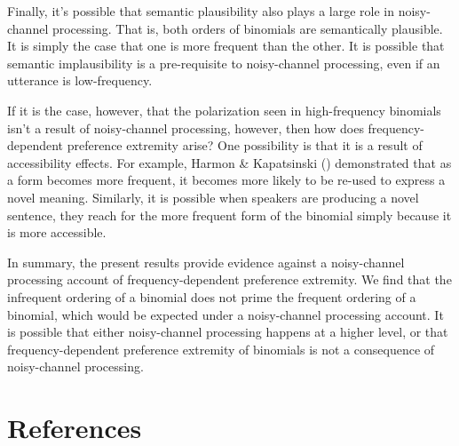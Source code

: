 \documentclass[
  12pt,
]{scrartcl}
\begin{document}
Finally, it's possible that semantic plausibility also plays a large
role in noisy-channel processing. That is, both orders of binomials are
semantically plausible. It is simply the case that one is more frequent
than the other. It is possible that semantic implausibility is a
pre-requisite to noisy-channel processing, even if an utterance is
low-frequency.

If it is the case, however, that the polarization seen in high-frequency
binomials isn't a result of noisy-channel processing, however, then how
does frequency-dependent preference extremity arise? One possibility is
that it is a result of accessibility effects. For example, Harmon \&
Kapatsinski ()
demonstrated that as a form becomes more frequent, it becomes more
likely to be re-used to express a novel meaning. Similarly, it is
possible when speakers are producing a novel sentence, they reach for
the more frequent form of the binomial simply because it is more
accessible.

In summary, the present results provide evidence against a noisy-channel
processing account of frequency-dependent preference extremity. We find
that the infrequent ordering of a binomial does not prime the frequent
ordering of a binomial, which would be expected under a noisy-channel
processing account. It is possible that either noisy-channel processing
happens at a higher level, or that frequency-dependent preference
extremity of binomials is not a consequence of noisy-channel processing.

\clearpage

\section*{References}\label{references}
\end{document}

